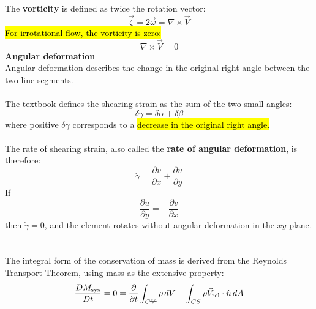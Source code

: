 ﻿\documentclass[12pt]{article}
\newcommand{\vol}{\mathord{\text{\ooalign{\hidewidth $V$\hidewidth\cr\kern-0.5pt\raisebox{0.8ex}{\rule[0pt]{1em}{0.5pt}}}}}}
\begin{document}
The \textbf{vorticity} is defined as twice the rotation vector:
\[
\boxed{\vec\zeta=2\vec\omega=\nabla\times\vec V}
\]
\hl{For irrotational flow, the vorticity is zero:}
\[\nabla \times \vec V=0\]
\textbf{Angular deformation}\\
Angular deformation describes the change in the original right angle between the two line segments.\\\\
The textbook defines the shearing strain as the sum of the two small angles:
\[
\delta\gamma=\delta\alpha+\delta\beta
\]
where positive \(\delta\gamma\) corresponds to a \hl{decrease in the original right angle.}\\\\
The rate of shearing strain, also called the \textbf{rate of angular deformation}, is therefore:
\[
\boxed{\dot\gamma=\frac{\partial v}{\partial x}+\frac{\partial u}{\partial y}}
\]
If
\[
\frac{\partial u}{\partial y}=-\frac{\partial v}{\partial x}
\]
then \(\dot\gamma=0\), and the element rotates without angular deformation in the \(xy\)-plane.
\section*{}
The integral form of the conservation of mass is derived from the Reynolds Transport Theorem, using mass as the extensive property:
\[\frac{DM_{\text{sys}}}{Dt} = 0 = \frac{\partial}{\partial t}\int_{C\vol} \rho \, dV + \int_{CS} \rho \vec{V}_{\text{rel}} \cdot \hat{n} \, dA\]
\end{document}
